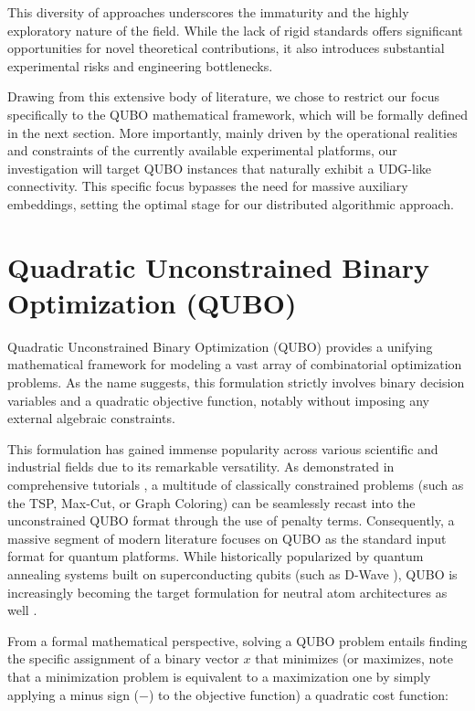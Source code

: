 This diversity of approaches underscores the immaturity and the highly exploratory nature of the field. While the lack of rigid standards offers significant opportunities for novel theoretical contributions, it also introduces substantial experimental risks and engineering bottlenecks. 

Drawing from this extensive body of literature, we chose to restrict our focus specifically to the QUBO mathematical framework, which will be formally defined in the next section. More importantly, mainly driven by the operational realities and constraints of the currently available experimental platforms, our investigation will target QUBO instances that naturally exhibit a UDG-like connectivity. This specific focus bypasses the need for massive auxiliary embeddings, setting the optimal stage for our distributed algorithmic approach.


\section{Quadratic Unconstrained Binary Optimization (QUBO)}
\label{sec:QUBO}

Quadratic Unconstrained Binary Optimization (QUBO) provides a unifying mathematical framework for modeling a vast array of combinatorial optimization problems. As the name suggests, this formulation strictly involves binary decision variables and a quadratic objective function, notably without imposing any external algebraic constraints. 

This formulation has gained immense popularity across various scientific and industrial fields due to its remarkable versatility. As demonstrated in comprehensive tutorials \cite{glover2018tutorial}, a multitude of classically constrained problems (such as the TSP, Max-Cut, or Graph Coloring) can be seamlessly recast into the unconstrained QUBO format through the use of penalty terms. Consequently, a massive segment of modern literature focuses on QUBO as the standard input format for quantum platforms. While historically popularized by quantum annealing systems built on superconducting qubits (such as D-Wave \cite{QUBO-D-Wave}), QUBO is increasingly becoming the target formulation for neutral atom architectures as well \cite{nowak2026satellitemissionplanningrydberg, Vercellino_2022, das2025grid}.

From a formal mathematical perspective, solving a QUBO problem entails finding the specific assignment of a binary vector $x$ that minimizes (or maximizes, note that a minimization problem is equivalent to a maximization one by simply applying a minus sign ($-$) to the objective function) a quadratic cost function:

